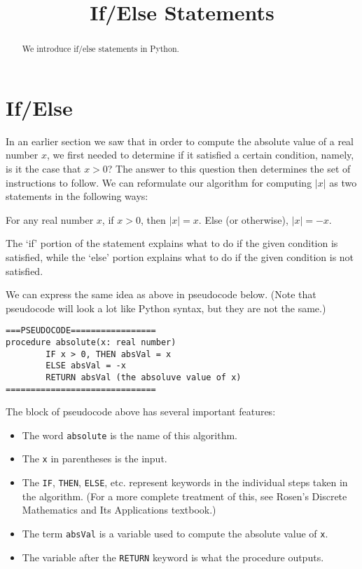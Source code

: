 \documentclass{ximera}
\title{If/Else Statements}
\begin{document}
\lstset{language=Python,frame=tb}
\begin{abstract}
We introduce if/else statements in Python.
\end{abstract}
\maketitle

\section{If/Else}

In an earlier section we saw that in order to compute the absolute value of a real number $x$, we first needed to determine if it satisfied a certain condition, namely, is it the case that $x>0$? The answer to this question then determines the set of instructions to follow. We can reformulate our algorithm for computing $|x|$ as two statements in the following ways:

For any real number $x$, if $x>0$, then $|x|=x$. Else (or otherwise), $|x|=-x$.

The `if' portion of the statement explains what to do if the given condition is satisfied, while the `else' portion explains what to do if the given condition is not satisfied.

We can express the same idea as above in pseudocode below. (Note that pseudocode will look a lot like Python syntax, but they are not the same.)

\begin{verbatim}
===PSEUDOCODE=================
procedure absolute(x: real number)
        IF x > 0, THEN absVal = x
        ELSE absVal = -x
        RETURN absVal (the absoluve value of x)
==============================
\end{verbatim}

The block of pseudocode above has several important features:

\begin{itemize}
	\item The word \verb|absolute| is the name of this algorithm.
	\item The \verb|x| in parentheses is the input.
	\item The \verb|IF|, \verb|THEN|, \verb|ELSE|, etc. represent keywords in the individual steps taken in the algorithm. (For a more complete treatment of this, see Rosen's Discrete Mathematics and Its Applications textbook.)
	\item The term \verb|absVal| is a variable used to compute the absolute value of \verb|x|.
	\item The variable after the \verb|RETURN| keyword is what the procedure outputs.
\end{itemize}
\end{document}
